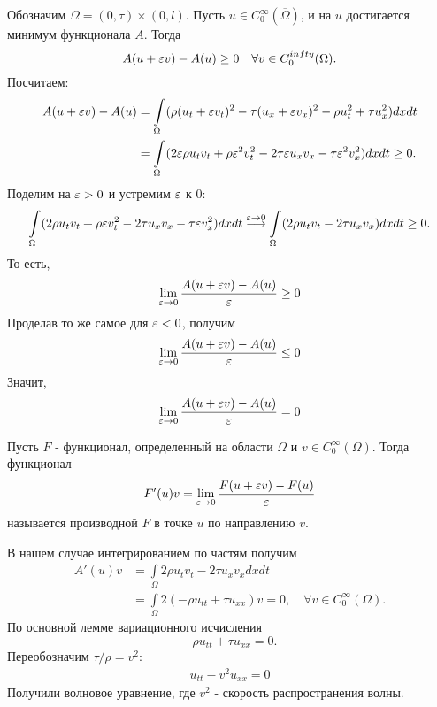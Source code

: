 Обозначим $\Omega = (0, \tau) \times (0, l)$.
Пусть $u \in C^{\infty}_0(\overline{\Omega})$, и на $u$ достигается минимум функционала $A$. Тогда 
$$A(u + \varepsilon v) - A(u) \geq 0\quad \forall v \in C^{infty}_0(\Omega).$$
Посчитаем:
\begin{align*}
A(u + \varepsilon v) - A(u) & =  \int \limits_{\Omega} (\rho(u_t + \varepsilon v_t)^2 - \tau(u_x + \varepsilon v_x)^2 - \rho u_t^2 + \tau u_x^2 ) dxdt \\
 & = \int \limits_{\Omega} (2 \varepsilon \rho u_t v_t + \rho \varepsilon^2 v_t^2 - 2 \tau \varepsilon u_x v_x - \tau \varepsilon^2 v_x^2 ) dxdt \geq 0 .
\end{align*}
Поделим на $\varepsilon > 0$ и устремим $\varepsilon$ к $0$:
$$ \int \limits_{\Omega} (2 \rho u_t v_t + \rho \varepsilon v_t^2 - 2 \tau u_x v_x - \tau \varepsilon v_x^2 ) dxdt \stackrel{\varepsilon \to 0} \longrightarrow \int \limits_{\Omega} (2 \rho u_t v_t - 2 \tau u_x v_x) dxdt \geq 0 .$$
То есть,
$$ \lim \limits_{\varepsilon \to 0} \frac {A(u + \varepsilon v) - A(u)} {\varepsilon} \geq 0$$
Проделав то же самое для $\varepsilon < 0$, получим
$$ \lim \limits_{\varepsilon \to 0} \frac {A(u + \varepsilon v) - A(u)} {\varepsilon} \leq 0$$
Значит, $$ \lim \limits_{\varepsilon \to 0} \frac {A(u + \varepsilon v) - A(u)} {\varepsilon} = 0$$

\begin{definition} Пусть $F$ - функционал, определенный на области $\Omega$ и $v \in C^{\infty}_0(\Omega)$. Тогда функционал 
$$ F'(u)v = \lim \limits_{\varepsilon \to 0} \frac {F(u + \varepsilon v) - F(u)} {\varepsilon}$$
называется производной $F$ в точке $u$ по направлению $v$.
\end{definition}

В нашем случае интегрированием по частям получим
\begin{align*}
A'(u)v &  = \int \limits_{\Omega} 2 \rho u_t v_t - 2 \tau u_x v_x dx dt \\
       &  = \int \limits_{\Omega} 2 (-\rho u_{tt} + \tau u_{xx}) v = 0,\quad \forall v \in C^{\infty}_0 (\Omega).
\end{align*}
По основной лемме вариационного исчисления 
$$ -\rho u_{tt} + \tau u_{xx} = 0 .$$
Переобозначим $\tau / \rho = v^2 $:
\begin{align}
    u_{tt} - v^2 u_{xx} = 0
\label{waveequation}
\end{align}
Получили волновое уравнение, где $v^2$ - скорость распространения волны.